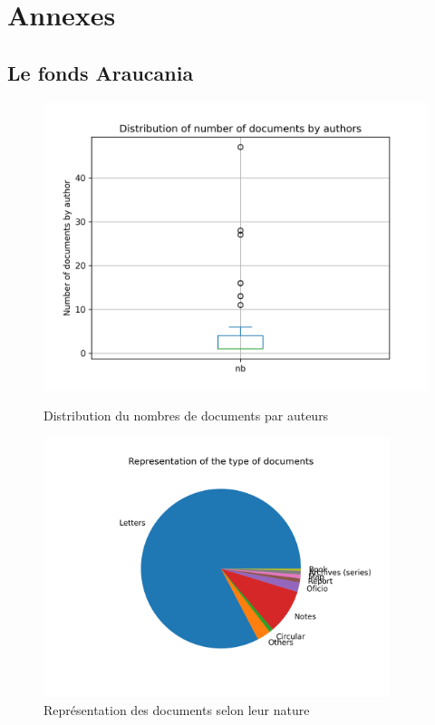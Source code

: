 \appendix


\part*{Annexes}

\chapter{Le fonds Araucania}
\begin{figure}
	    \centering
    	\includegraphics[width = 1\textwidth]{annexes/graph/author_distribution.png}
    	\caption{Distribution du nombres de documents par auteurs}
    	\label{fig:author_distribution}
    	\includegraphics[width = 0.9\textwidth]{annexes/graph/percent_type.png}
    	\caption{Représentation des documents selon leur nature}
    	\label{fig:percent_type}
\end{figure}
